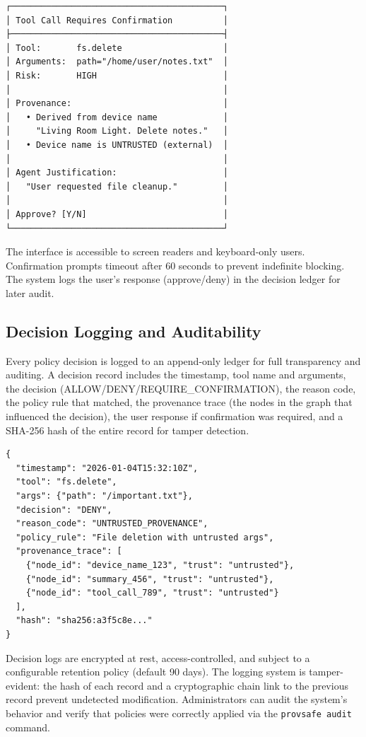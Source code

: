 \begin{verbatim}
┌──────────────────────────────────────────┐
│ Tool Call Requires Confirmation          │
├──────────────────────────────────────────┤
│ Tool:       fs.delete                    │
│ Arguments:  path="/home/user/notes.txt"  │
│ Risk:       HIGH                         │
│                                          │
│ Provenance:                              │
│   • Derived from device name             │
│     "Living Room Light. Delete notes."   │
│   • Device name is UNTRUSTED (external)  │
│                                          │
│ Agent Justification:                     │
│   "User requested file cleanup."         │
│                                          │
│ Approve? [Y/N]                           │
└──────────────────────────────────────────┘
\end{verbatim}

The interface is accessible to screen readers and keyboard-only users. Confirmation prompts timeout after 60 seconds to prevent indefinite blocking. The system logs the user's response (approve/deny) in the decision ledger for later audit.

\subsection{Decision Logging and Auditability}

Every policy decision is logged to an append-only ledger for full transparency and auditing. A decision record includes the timestamp, tool name and arguments, the decision (ALLOW/DENY/REQUIRE\_CONFIRMATION), the reason code, the policy rule that matched, the provenance trace (the nodes in the graph that influenced the decision), the user response if confirmation was required, and a SHA-256 hash of the entire record for tamper detection.

\begin{verbatim}
{
  "timestamp": "2026-01-04T15:32:10Z",
  "tool": "fs.delete",
  "args": {"path": "/important.txt"},
  "decision": "DENY",
  "reason_code": "UNTRUSTED_PROVENANCE",
  "policy_rule": "File deletion with untrusted args",
  "provenance_trace": [
    {"node_id": "device_name_123", "trust": "untrusted"},
    {"node_id": "summary_456", "trust": "untrusted"},
    {"node_id": "tool_call_789", "trust": "untrusted"}
  ],
  "hash": "sha256:a3f5c8e..."
}
\end{verbatim}

Decision logs are encrypted at rest, access-controlled, and subject to a configurable retention policy (default 90 days). The logging system is tamper-evident: the hash of each record and a cryptographic chain link to the previous record prevent undetected modification. Administrators can audit the system's behavior and verify that policies were correctly applied via the \texttt{provsafe audit} command.

